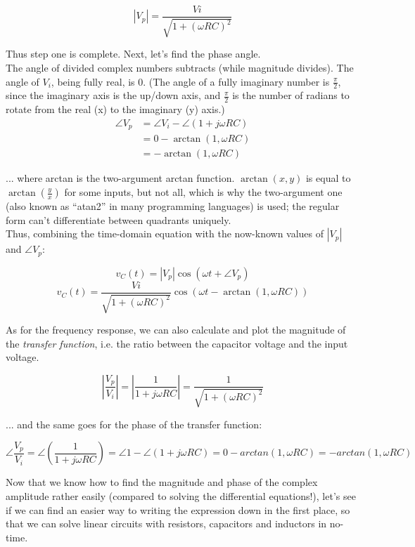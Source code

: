 \documentclass[12pt,a4paper]{report}
\begin{document}
\[ |V_p| = \frac{Vi}{\sqrt{1 + (\omega R C)^2}} \]

Thus step one is complete. Next, let's find the phase angle.\\
The angle of divided complex numbers subtracts (while magnitude divides). The angle of $V_i$, being fully real, is 0. (The angle of a fully imaginary number is $\displaystyle \frac{\pi}{2}$, since the imaginary axis is the up/down axis, and $\displaystyle \frac{\pi}{2}$ is the number of radians to rotate from the real (x) to the imaginary (y) axis.)\\

\begin{align*}
  \angle V_p &= \angle V_i - \angle (1 + j \omega R C) \\ 
  &= 0 - \arctan{(1, \omega R C)} \\
  &= -\arctan{(1, \omega R C)}
\end{align*}

... where arctan is the two-argument arctan function. $\arctan{(x, y)}$ is equal to $\displaystyle \arctan{(\frac{y}{x})}$ for some inputs, but not all, which is why the two-argument one (also known as ``atan2'' in many programming languages) is used; the regular form can't differentiate between quadrants uniquely.\\

Thus, combining the time-domain equation with the now-known values of $|V_p|$ and $\angle V_p$:

\[ v_C(t) = \left| V_p \right| \cos{(\omega t + \angle V_p)} \]
\[ v_C(t) = \frac{Vi}{\sqrt{1 + (\omega R C)^2}} \cos{(\omega t - \arctan{(1, \omega R C)} )} \]

As for the frequency response, we can also calculate and plot the magnitude of the \emph{transfer function}, i.e. the ratio between the capacitor voltage and the input voltage.

\[ \left| \frac{V_p}{V_i} \right| = \left| \frac{1}{1 + j \omega R C} \right| = \frac{1}{\sqrt{1 + (\omega R C)^2}} \]

... and the same goes for the phase of the transfer function:

\[ \angle \frac{V_p}{V_i} = \angle \left( \frac{1}{1 + j \omega R C} \right) = \angle 1 - \angle (1 + j \omega R C) = 0 - arctan(1, \omega R C) = -arctan(1, \omega R C) \] 

Now that we know how to find the magnitude and phase of the complex amplitude rather easily (compared to solving the differential equations!), let's see if we can find an easier way to writing the expression down in the first place, so that we can solve linear circuits with resistors, capacitors and inductors in no-time.
\end{document}
